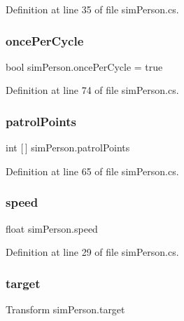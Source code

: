 Definition at line 35 of file sim\+Person.\+cs.

\hypertarget{classsim_person_a21ac457e8040d80854cb5b1ab59bfd6f}{}\label{classsim_person_a21ac457e8040d80854cb5b1ab59bfd6f} 
\subsubsection{\texorpdfstring{once\+Per\+Cycle}{oncePerCycle}}
{\footnotesize\ttfamily bool sim\+Person.\+once\+Per\+Cycle = true}



Definition at line 74 of file sim\+Person.\+cs.

\hypertarget{classsim_person_aebd6a40f59fce0a78e71599b0b39bc67}{}\label{classsim_person_aebd6a40f59fce0a78e71599b0b39bc67} 
\subsubsection{\texorpdfstring{patrol\+Points}{patrolPoints}}
{\footnotesize\ttfamily int \mbox{[}$\,$\mbox{]} sim\+Person.\+patrol\+Points}



Definition at line 65 of file sim\+Person.\+cs.

\hypertarget{classsim_person_a28e2b04758c3682f50ba01eb5d1740c0}{}\label{classsim_person_a28e2b04758c3682f50ba01eb5d1740c0} 
\subsubsection{\texorpdfstring{speed}{speed}}
{\footnotesize\ttfamily float sim\+Person.\+speed}



Definition at line 29 of file sim\+Person.\+cs.

\hypertarget{classsim_person_a5db445fe5749d0b0165efeb3bd7b0ba9}{}\label{classsim_person_a5db445fe5749d0b0165efeb3bd7b0ba9} 
\subsubsection{\texorpdfstring{target}{target}}
{\footnotesize\ttfamily Transform sim\+Person.\+target}



